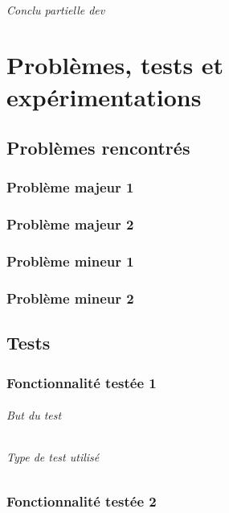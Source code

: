 \documentclass[
	headsepline=on,
	footsepline=on,
	twoside=off,
	abstract=on,
	DIV=10
]{scrreprt}
\begin{document}
		
		
		\paragraph{Conclu partielle dev}
	
	\part{Problèmes, tests et expérimentations}
	
		\chapter{Problèmes rencontrés}
		
			\section{Problème majeur 1}
			\section{Problème majeur 2}
			
			\section{Problème mineur 1}
			\section{Problème mineur 2}

		\chapter{Tests}
			\section{Fonctionnalité testée 1}
				\paragraph{But du test}
				\paragraph{Type de test utilisé}

			\section{Fonctionnalité testée 2}
\end{document}
